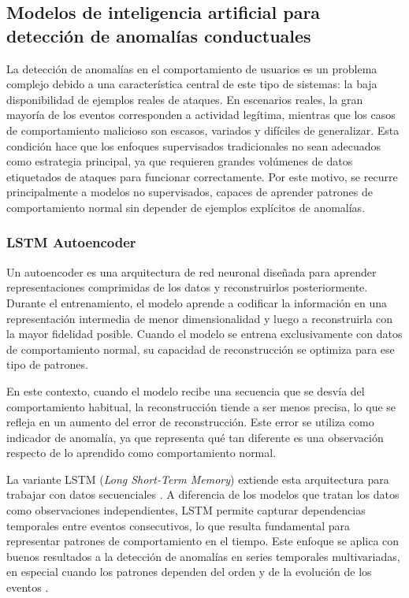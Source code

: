 \subsection{Modelos de inteligencia artificial para detección de anomalías conductuales}
La detección de anomalías en el comportamiento de usuarios es un problema complejo debido a una característica central de este tipo de sistemas: la baja disponibilidad de ejemplos reales de ataques. En escenarios reales, la gran mayoría de los eventos corresponden a actividad legítima, mientras que los casos de comportamiento malicioso son escasos, variados y difíciles de generalizar. Esta condición hace que los enfoques supervisados tradicionales no sean adecuados como estrategia principal, ya que requieren grandes volúmenes de datos etiquetados de ataques para funcionar correctamente. Por este motivo, se recurre principalmente a modelos no supervisados, capaces de aprender patrones de comportamiento normal sin depender de ejemplos explícitos de anomalías.

\subsubsection{LSTM Autoencoder}
Un autoencoder es una arquitectura de red neuronal diseñada para aprender representaciones comprimidas de los datos y reconstruirlos posteriormente. Durante el entrenamiento, el modelo aprende a codificar la información en una representación intermedia de menor dimensionalidad y luego a reconstruirla con la mayor fidelidad posible. Cuando el modelo se entrena exclusivamente con datos de comportamiento normal, su capacidad de reconstrucción se optimiza para ese tipo de patrones.

En este contexto, cuando el modelo recibe una secuencia que se desvía del comportamiento habitual, la reconstrucción tiende a ser menos precisa, lo que se refleja en un aumento del error de reconstrucción. Este error se utiliza como indicador de anomalía, ya que representa qué tan diferente es una observación respecto de lo aprendido como comportamiento normal.

La variante LSTM (\emph{Long Short-Term Memory}) extiende esta arquitectura para trabajar con datos secuenciales \parencite{Hochreiter1997}. A diferencia de los modelos que tratan los datos como observaciones independientes, LSTM permite capturar dependencias temporales entre eventos consecutivos, lo que resulta fundamental para representar patrones de comportamiento en el tiempo. Este enfoque se aplica con buenos resultados a la detección de anomalías en series temporales multivariadas, en especial cuando los patrones dependen del orden y de la evolución de los eventos \parencite{Malhotra2016}.

